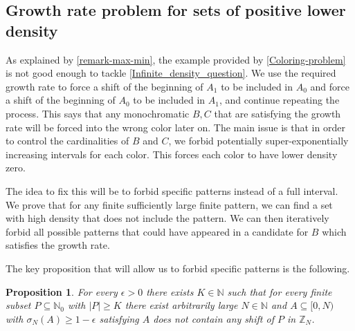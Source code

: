 \documentclass[letter, 11pt]{article}
\theoremstyle{plain} %
\newtheorem{proposition}[theorem]{Proposition}
\theoremstyle{definition} %
\theoremstyle{plain}
\theoremstyle{plain}
\newcommand{\N}{\mathbb{N}}
\newcommand{\Z}{\mathbb{Z}}
\newcommand{\1}{\mathbbm{1}}
\begin{document}
\subsection{Growth rate problem for sets of positive lower density}
As explained by \cref{remark-max-min}, the example provided by \cref{Coloring-problem} is not good enough to tackle \cref{Infinite_density_question}. We use the required growth rate to force a shift of the beginning of $A_1$ to be included in $A_0$ and force a shift of the beginning of $A_0$ to be included in $A_1$, and continue repeating the process. This says that any monochromatic $B,C$ that are satisfying the growth rate will be forced into the wrong color later on. The main issue is that in order to control the cardinalities of $B$ and $C$, we forbid potentially super-exponentially increasing intervals for each color. This forces each color to have lower density zero.

The idea to fix this will be to forbid specific patterns instead of a full interval. We prove that for any finite sufficiently large finite pattern, we can find a set with high density that does not include the pattern. We can then iteratively forbid all possible patterns that could have appeared in a candidate for $B$ which satisfies the growth rate.  

The key proposition that will allow us to forbid specific patterns is the following. \begin{proposition}\label{Forbidding-finite-patterns}
    For every $\epsilon>0$ there exists $K\in \N$ such that for every finite subset $P\subseteq \N_0$ with $|P|\geq K$ there exist arbitrarily large $N\in \N$ and $A\subseteq [0,N)$ with $\sigma_N(A)\geq 1- \epsilon$ satisfying $A$ does not contain any shift of $P$ in $\Z_N$.
\end{proposition}
\end{document}
